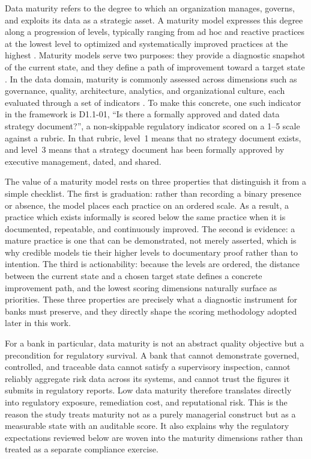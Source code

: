 Data maturity refers to the degree to which an organization manages, governs, and exploits its data as a strategic asset. A maturity model expresses this degree along a progression of levels, typically ranging from ad hoc and reactive practices at the lowest level to optimized and systematically improved practices at the highest \cite{cmmi}. Maturity models serve two purposes: they provide a diagnostic snapshot of the current state, and they define a path of improvement toward a target state \cite{gartner}. In the data domain, maturity is commonly assessed across dimensions such as governance, quality, architecture, analytics, and organizational culture, each evaluated through a set of indicators \cite{dama2017}. To make this concrete, one such indicator in the framework is D1.1-01, ``Is there a formally approved and dated data strategy document?'', a non-skippable regulatory indicator scored on a 1--5 scale against a rubric. In that rubric, level~1 means that no strategy document exists, and level~3 means that a strategy document has been formally approved by executive management, dated, and shared.

The value of a maturity model rests on three properties that distinguish it from a simple checklist. The first is graduation: rather than recording a binary presence or absence, the model places each practice on an ordered scale. As a result, a practice which exists informally is scored below the same practice when it is documented, repeatable, and continuously improved. The second is evidence: a mature practice is one that can be demonstrated, not merely asserted, which is why credible models tie their higher levels to documentary proof rather than to intention. The third is actionability: because the levels are ordered, the distance between the current state and a chosen target state defines a concrete improvement path, and the lowest scoring dimensions naturally surface as priorities. These three properties are precisely what a diagnostic instrument for banks must preserve, and they directly shape the scoring methodology adopted later in this work.

For a bank in particular, data maturity is not an abstract quality objective but a precondition for regulatory survival. A bank that cannot demonstrate governed, controlled, and traceable data cannot satisfy a supervisory inspection, cannot reliably aggregate risk data across its systems, and cannot trust the figures it submits in regulatory reports. Low data maturity therefore translates directly into regulatory exposure, remediation cost, and reputational risk. This is the reason the study treats maturity not as a purely managerial construct but as a measurable state with an auditable score. It also explains why the regulatory expectations reviewed below are woven into the maturity dimensions rather than treated as a separate compliance exercise.

